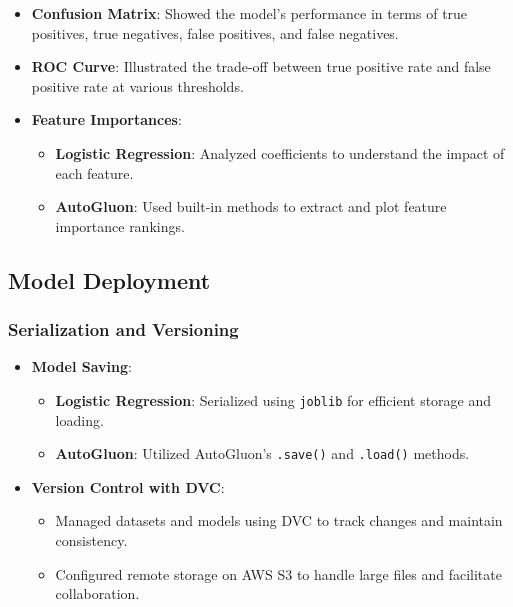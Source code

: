 \documentclass{article}
\begin{document}
\begin{itemize}[leftmargin=*]
    \item \textbf{Confusion Matrix}: Showed the model's performance in terms of true positives, true negatives, false positives, and false negatives.
    \item \textbf{ROC Curve}: Illustrated the trade-off between true positive rate and false positive rate at various thresholds.
    \item \textbf{Feature Importances}:
        \begin{itemize}[leftmargin=*]
            \item \textbf{Logistic Regression}: Analyzed coefficients to understand the impact of each feature.
            \item \textbf{AutoGluon}: Used built-in methods to extract and plot feature importance rankings.
        \end{itemize}
\end{itemize}



\subsection{Model Deployment}

\subsubsection{Serialization and Versioning}

\begin{itemize}[leftmargin=*]
    \item \textbf{Model Saving}:
        \begin{itemize}[leftmargin=*]
            \item \textbf{Logistic Regression}: Serialized using \texttt{joblib} for efficient storage and loading.
            \item \textbf{AutoGluon}: Utilized AutoGluon's \texttt{.save()} and \texttt{.load()} methods.
        \end{itemize}
    \item \textbf{Version Control with DVC}:
        \begin{itemize}[leftmargin=*]
            \item Managed datasets and models using DVC to track changes and maintain consistency.
            \item Configured remote storage on AWS S3 to handle large files and facilitate collaboration.
        \end{itemize}
\end{itemize}
\end{document}
